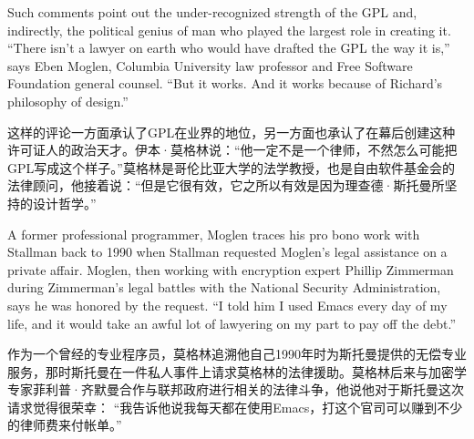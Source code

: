 \ifdefined\eng
Such comments point out the under-recognized strength of the GPL and, indirectly, the political genius of man who played the largest role in creating it. ``There isn't a lawyer on earth who would have drafted the GPL the way it is,'' says Eben Moglen, Columbia University law professor and Free Software Foundation general counsel. ``But it works. And it works because of Richard's philosophy of design.''
\fi

\ifdefined\chs
这样的评论一方面承认了GPL在业界的地位，另一方面也承认了在幕后创建这种许可证人的政治天才。伊本·莫格林说：``他一定不是一个律师，不然怎么可能把GPL写成这个样子。''莫格林是哥伦比亚大学的法学教授，也是自由软件基金会的法律顾问，他接着说：``但是它很有效，它之所以有效是因为理查德·斯托曼所坚持的设计哲学。''
\fi

\ifdefined\eng
A former professional programmer, Moglen traces his pro bono work with Stallman back to 1990 when Stallman requested Moglen's legal assistance on a private affair. Moglen, then working with encryption expert Phillip Zimmerman during Zimmerman's legal battles with the National Security Administration, says he was honored by the request.%
``I told him I used Emacs every day of my life, and it would take an awful lot of lawyering on my part to pay off the debt.''
\fi

\ifdefined\chs
作为一个曾经的专业程序员，莫格林追溯他自己1990年时为斯托曼提供的无偿专业服务，那时斯托曼在一件私人事件上请求莫格林的法律援助。莫格林后来与加密学专家菲利普·齐默曼合作与联邦政府进行相关的法律斗争，他说他对于斯托曼这次请求觉得很荣幸：%
``我告诉他说我每天都在使用Emacs，打这个官司可以赚到不少的律师费来付帐单。''
\fi

